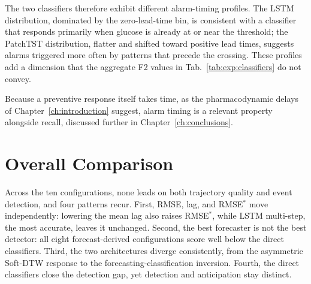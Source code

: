 The two classifiers therefore exhibit different alarm-timing profiles. The LSTM distribution, dominated by the zero-lead-time bin, is consistent with a classifier that responds primarily when glucose is already at or near the threshold; the PatchTST distribution, flatter and shifted toward positive lead times, suggests alarms triggered more often by patterns that precede the crossing. These profiles add a dimension that the aggregate F2 values in Tab.~\ref{tab:exp:classifiers} do not convey.

Because a preventive response itself takes time, as the pharmacodynamic delays of Chapter~\ref{ch:introduction} suggest, alarm timing is a relevant property alongside recall, discussed further in Chapter~\ref{ch:conclusions}.


\section{Overall Comparison} \label{sec:exp:overall}

Across the ten configurations, none leads on both trajectory quality and event detection, and four patterns recur. First, RMSE, lag, and RMSE$^*$ move independently: lowering the mean lag also raises RMSE$^*$, while LSTM multi-step, the most accurate, leaves it unchanged. Second, the best forecaster is not the best detector: all eight forecast-derived configurations score well below the direct classifiers. Third, the two architectures diverge consistently, from the asymmetric Soft-DTW response to the forecasting-classification inversion. Fourth, the direct classifiers close the detection gap, yet detection and anticipation stay distinct.

